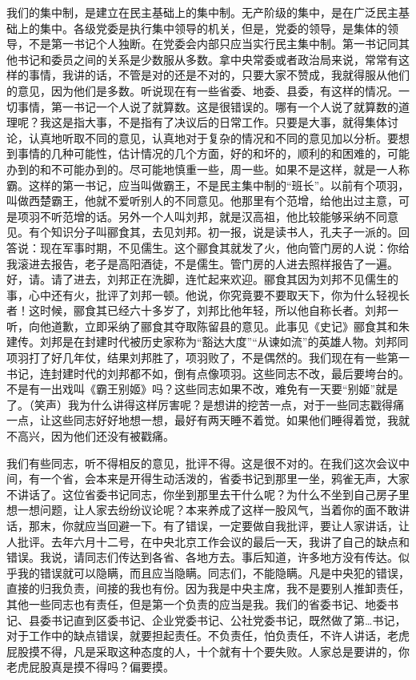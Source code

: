 我们的集中制，是建立在民主基础上的集中制。无产阶级的集中，是在广泛民主基础上的集中。各级党委是执行集中领导的机关，但是，党委的领导，是集体的领导，不是第一书记个人独断。在党委会内部只应当实行民主集中制。第一书记同其他书记和委员之间的关系是少数服从多数。拿中央常委或者政治局来说，常常有这样的事情，我讲的话，不管是对的还是不对的，只要大家不赞成，我就得服从他们的意见，因为他们是多数。听说现在有一些省委、地委、县委，有这样的情况。一切事情，第一书记一个人说了就算数。这是很错误的。哪有一个人说了就算数的道理呢？我这是指大事，不是指有了决议后的日常工作。只要是大事，就得集体讨论，认真地听取不同的意见，认真地对于复杂的情况和不同的意见加以分析。要想到事情的几种可能性，估计情况的几个方面，好的和坏的，顺利的和困难的，可能办到的和不可能办到的。尽可能地慎重一些，周一些。如果不是这样，就是一人称霸。这样的第一书记，应当叫做霸王，不是民主集中制的“班长”。以前有个项羽，叫做西楚霸王，他就不爱听别人的不同意见。他那里有个范增，给他出过主意，可是项羽不听范增的话。另外一个人叫刘邦，就是汉高祖，他比较能够采纳不同意见。有个知识分子叫郦食其，去见刘邦。初一报，说是读书人，孔夫子一派的。回答说：现在军事时期，不见儒生。这个郦食其就发了火，他向管门房的人说：你给我滚进去报告，老子是高阳酒徒，不是儒生。管门房的人进去照样报告了一遍。好，请。请了进去，刘邦正在洗脚，连忙起来欢迎。郦食其因为刘邦不见儒生的事，心中还有火，批评了刘邦一顿。他说，你究竟要不要取天下，你为什么轻视长者！这时候，郦食其已经六十多岁了，刘邦比他年轻，所以他自称长者。刘邦一听，向他道歉，立即采纳了郦食其夺取陈留县的意见。此事见《史记》郦食其和朱建传。刘邦是在封建时代被历史家称为“豁达大度”“从谏如流”的英雄人物。刘邦同项羽打了好几年仗，结果刘邦胜了，项羽败了，不是偶然的。我们现在有一些第一书记，连封建时代的刘邦都不如，倒有点像项羽。这些同志不改，最后要垮台的。不是有一出戏叫《霸王别姬》吗？这些同志如果不改，难免有一天要“别姬”就是了。（笑声）我为什么讲得这样厉害呢？是想讲的挖苦一点，对于一些同志戳得痛一点，让这些同志好好地想一想，最好有两天睡不着觉。如果他们睡得着觉，我就不高兴，因为他们还没有被戳痛。

我们有些同志，听不得相反的意见，批评不得。这是很不对的。在我们这次会议中间，有一个省，会本来是开得生动活泼的，省委书记到那里一坐，鸦雀无声，大家不讲话了。这位省委书记同志，你坐到那里去干什么呢？为什么不坐到自己房子里想一想问题，让人家去纷纷议论呢？本来养成了这样一股风气，当着你的面不敢讲话，那末，你就应当回避一下。有了错误，一定要做自我批评，要让人家讲话，让人批评。去年六月十二号，在中央北京工作会议的最后一天，我讲了自己的缺点和错误。我说，请同志们传达到各省、各地方去。事后知道，许多地方没有传达。似乎我的错误就可以隐瞒，而且应当隐瞒。同志们，不能隐瞒。凡是中央犯的错误，直接的归我负责，间接的我也有份。因为我是中央主席，我不是要别人推卸责任，其他一些同志也有责任，但是第一个负责的应当是我。我们的省委书记、地委书记、县委书记直到区委书记、企业党委书记、公社党委书记，既然做了第…书记，对于工作中的缺点错误，就要担起责任。不负责任，怕负责任，不许人讲话，老虎屁股摸不得，凡是采取这种态度的人，十个就有十个要失败。人家总是要讲的，你老虎屁股真是摸不得吗？偏要摸。

